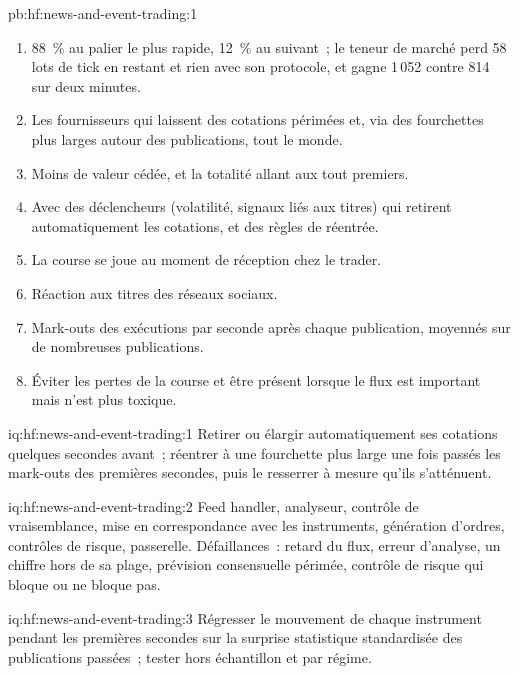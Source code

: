 \begin{solution}{pb:hf:news-and-event-trading:1}
\begin{enumerate}
\item 88~\% au palier le plus rapide, 12~\% au suivant~; le teneur de marché perd 58 lots de tick en restant et rien avec son protocole, et gagne 1\,052 contre 814
sur deux minutes.
\item Les fournisseurs qui laissent des cotations périmées et, via des fourchettes plus larges autour des publications, tout le monde.
\item Moins de valeur cédée, et la totalité allant aux tout premiers.
\item Avec des déclencheurs (volatilité, signaux liés aux titres) qui retirent automatiquement les cotations, et des règles de réentrée.
\item La course se joue au moment de réception chez le trader.
\item Réaction aux titres des réseaux sociaux.
\item Mark-outs des exécutions par seconde après chaque publication, moyennés sur de nombreuses publications.
\item Éviter les pertes de la course et être présent lorsque le flux est important mais n'est plus toxique.
\end{enumerate}
\end{solution}

\begin{solution}{iq:hf:news-and-event-trading:1}
Retirer ou élargir automatiquement ses cotations quelques secondes avant~; réentrer à une fourchette plus large une fois passés les mark-outs des premières secondes, puis
le resserrer à mesure qu'ils s'atténuent.
\end{solution}

\begin{solution}{iq:hf:news-and-event-trading:2}
Feed handler, analyseur, contrôle de vraisemblance, mise en correspondance avec les instruments, génération d'ordres, contrôles de risque, passerelle. Défaillances~: retard du flux, erreur d'analyse, un
chiffre hors de sa plage, prévision consensuelle périmée, contrôle de risque qui bloque ou ne bloque pas.
\end{solution}

\begin{solution}{iq:hf:news-and-event-trading:3}
Régresser le mouvement de chaque instrument pendant les premières secondes sur la surprise statistique standardisée des publications passées~; tester hors échantillon et par régime.
\end{solution}

